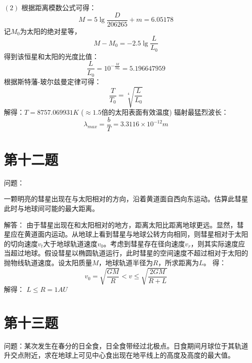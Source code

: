 \documentclass[a4paper,12pt]{report}
\begin{document}
\noindent $\left(2\right)$
根据距离模数公式可得：
\begin{equation}
	M=5\lg \frac{D}{206265}+m=6.05178
\end{equation}
记$M_{0}$为太阳的绝对星等，
\begin{equation}
	M-M_{0}=-2.5\lg \frac{L}{L_{0}}
\end{equation}
得到该恒星和太阳的光度比值：
\begin{equation}
	\frac{L}{L_{0}}=10^{-\frac{M}{M_{0}}}=5.196647959
\end{equation}
根据斯特藩-玻尔兹曼定律可得：
\begin{equation}
	\frac{T}{T_{0}}=\sqrt[4]{\frac{L}{L_{0}}}
\end{equation}
解得：$T=8757.069931K$ ($\approx 1.5$倍的太阳表面有效温度)
辐射最猛烈波长：
\begin{equation}
	\lambda_{max}=\frac{b}{T}=3.3116\times 10^{-12}m
\end{equation}

\section{第十二题}
\noindent 问题：

\noindent 一颗明亮的彗星出现在与太阳相对的方向，沿着黄道面自西向东运动。估算此彗星此时与地球间可能的最大距离。

\noindent 解答：
由于彗星出现在和太阳相对的地方，距离太阳比距离地球更远。显然，彗星应在黄道面内运动。从地球上看到彗星与地球公转方向相同，则彗星相对于太阳的切向速度$v_{t}$大于地球轨道速度$v_{0}$。考虑到彗星存在径向速度$v_{r}$，则其实际速度应当超过地球。假设彗星以椭圆轨道运行，此时彗星的空间速度不超过相对于太阳的抛物线轨道速度。设太阳质量$M$，地球轨道半径为$R$，所求距离为$L$。
得：
\begin{equation}
	v_{0}=\sqrt{\frac{GM}{R}} < v \leq \sqrt{\frac{2GM}{R+L}}
\end{equation}
解得：
$L \leq R=1AU$

\section{第十三题}
\noindent 问题：某次发生在春分的日全食，日全食带经过北极点。日食期间月球位于其轨道升交点附近，求在地球上可见中心食出现在地平线上的高度及高度的最大值。
\end{document}
